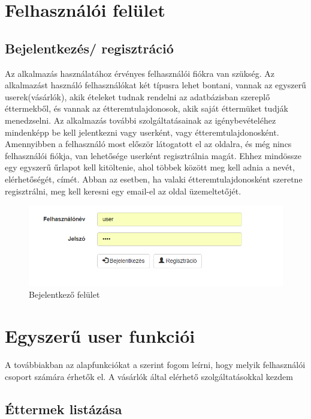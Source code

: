 \section{Felhasználói felület}

\subsection{Bejelentkezés/ regisztráció}

Az alkalmazás használatához érvényes felhasználói fiókra van szükség. Az alkalmazást használó felhasználókat két típusra lehet bontani, vannak az egyszerű userek(vásárlók), akik ételeket tudnak rendelni az adatbázisban szereplő éttermekből, és vannak az étteremtulajdonosok, akik saját éttermüket tudják menedzselni. Az alkalmazás további szolgáltatásainak az igénybevételéhez mindenképp be kell jelentkezni vagy userként, vagy étteremtulajdonosként. Amennyibben a felhasználó most először látogatott el az oldalra, és még nincs felhasználói fiókja, van lehetősége userként regisztrálnia magát. Ehhez mindössze egy egyszerű űrlapot kell kitöltenie, ahol többek között meg kell adnia a nevét, elérhetőségét, címét. Abban az esetben, ha valaki étteremtulajdonosként szeretne regisztrálni, meg kell keresni egy email-el az oldal üzemeltetőjét.

\begin{figure}
\centering
\includegraphics[scale=0.8]{kepek/login.png}
\caption{Bejelentkező felület}
\label{fig:architecture}
\end{figure}

\section{Egyszerű user funkciói}

A továbbiakban az alapfunkciókat a szerint fogom leírni, hogy melyik felhasználói csoport számára érhetők el. A vásárlók által elérhető szolgáltatásokkal kezdem

\subsection{Éttermek listázása}

